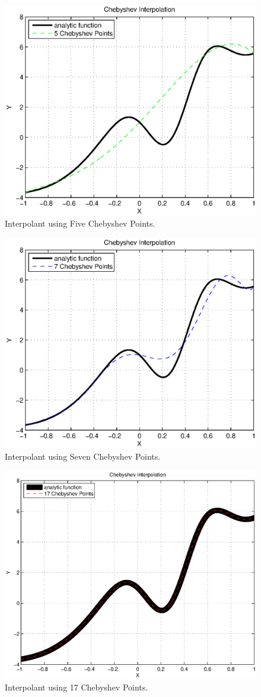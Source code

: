 \documentclass{report}
\theoremstyle{definition}
\begin{document}
\begin{figure}[H]
\centering
\includegraphics[width=.6\textwidth]{5chebpts.eps}
\caption{Interpolant using Five Chebyshev Points.}
\label{fig:digraph}
\end{figure}

\begin{figure}[H]
\centering
\includegraphics[width=.6\textwidth]{7chebpts.eps}
\caption{Interpolant using Seven Chebyshev Points. }
\label{fig:digraph}
\end{figure}


\begin{figure}[H]
\centering
\includegraphics[width=.5\textwidth]{17chebpts.eps}
\caption{Interpolant using 17 Chebyshev Points. }
\label{fig:digraph}
\end{figure}
\end{document}
